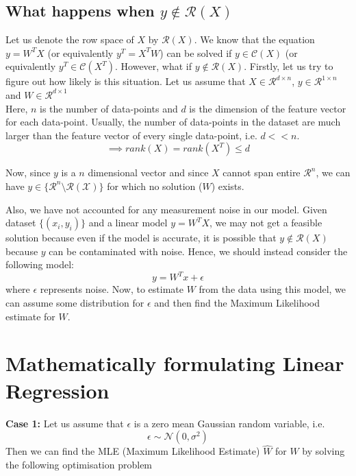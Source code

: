 \documentclass[11pt]{article}
\begin{document}
\subsection{What happens when \texorpdfstring{$y \not \in \mathcal{R}(X)$}{}}
Let us denote the row space of $X$ by $\mathcal{R}(X)$. We know that the equation $y = W^T X$ (or equivalently $y^T = X^T W$) can be solved if $y \in \mathcal{C}(X)$ (or equivalently $y^T \in \mathcal{C}(X^T)$. However, what if $y \not\in \mathcal{R}(X)$. Firstly, let us try to figure out how likely is this situation. Let us assume that $X \in \mathcal{R}^{d \times n}$, $y \in \mathcal{R}^{1 \times n} $ and $W \in \mathcal{R}^{d \times 1} $ \\
Here, $n$ is the number of data-points and $d$ is the dimension of the feature vector for each data-point. Usually, the number of data-points in the dataset are much larger than the feature vector of every single data-point, i.e. $d << n$.
\begin{equation}
    \implies rank(X) = rank(X^T) \leq d
\end{equation}

Now, since $y$ is a $n$ dimensional vector and since $X$ cannot span entire $\mathcal{R}^n$, we can have $y \in \{\mathcal{R}^n \setminus \mathcal{R (X)}\}$ for which no solution ($W$) exists.

Also, we have not accounted for any measurement noise in our model. Given dataset $\{ (x_i , y_i) \}$ and a linear model $y = W^T X$, we may not get a feasible solution because even if the model is accurate, it is possible that $y \not \in \mathcal{R}(X)$ because $y$ can be contaminated with noise. Hence, we should instead consider the following model:
\begin{equation}
    y = W^T x + \epsilon
\end{equation}
where $\epsilon$ represents noise. Now, to estimate $W$ from the data using this model, we can assume some distribution for $\epsilon$ and then find the Maximum Likelihood estimate for $W$.

\section{Mathematically formulating Linear Regression}
\textbf{Case 1:}
Let us assume that $\epsilon$ is a zero mean Gaussian random variable, i.e. 
\begin{equation}
    \epsilon \sim \mathcal{N} (0, \sigma^2)
\end{equation}
Then we can find the MLE (Maximum Likelihood Estimate) $\hat{W}$ for $W$ by solving the following optimisation problem
\end{document}

